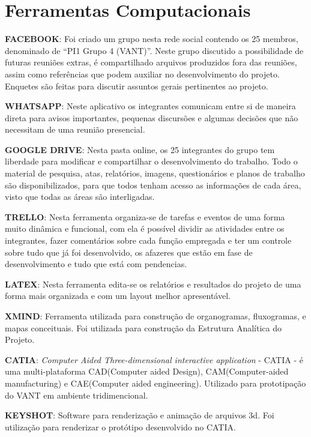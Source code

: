 \section{Ferramentas Computacionais}

\textbf{FACEBOOK}:
Foi criado um grupo nesta rede social contendo os 25 membros, denominado de “PI1 Grupo 4 (VANT)”. Neste grupo discutido a possibilidade de futuras reuniões extras, é compartilhado arquivos produzidos fora das reuniões, assim como referências que podem auxiliar no desenvolvimento do projeto. Enquetes são feitas para discutir assuntos gerais pertinentes ao projeto. 

\textbf{WHATSAPP}: 
Neste aplicativo os integrantes comunicam entre si de maneira direta para avisos importantes, pequenas discursões e algumas decisões que não necessitam de uma reunião presencial.

\textbf{GOOGLE DRIVE}: 
Nesta pasta online, os 25 integrantes do grupo tem liberdade para modificar e compartilhar o desenvolvimento do trabalho. Todo o material de pesquisa, atas, relatórios, imagens, questionários e planos de trabalho são disponibilizados, para que todos tenham acesso as informações de cada área, visto que todas as áreas são interligadas.

\textbf{TRELLO}:
Nesta ferramenta organiza-se de tarefas e eventos de uma forma muito dinâmica e funcional, com ela é possível dividir as atividades entre os integrantes, fazer comentários sobre cada função empregada e ter um controle sobre tudo que já foi desenvolvido, os afazeres que estão em fase de desenvolvimento e tudo que está com pendencias.

\textbf{LATEX}:
Nesta ferramenta edita-se os relatórios e resultados do projeto de uma forma mais organizada e com um layout melhor apresentável.


\textbf{XMIND}: Ferramenta utilizada para construção de organogramas, fluxogramas, e mapas conceituais. Foi utilizada para construção da Estrutura Analítica do Projeto.

\textbf{CATIA}:
\textit{Computer Aided Three-dimensional interactive application} - CATIA - é uma multi-plataforma CAD(Computer aided Design), CAM(Computer-aided manufacturing) e CAE(Computer aided engineering). Utilizado para prototipação do VANT em ambiente tridimencional.

\textbf{KEYSHOT}:
Software para renderização e animação de arquivos 3d. Foi utilização para renderizar o protótipo desenvolvido no CATIA.

